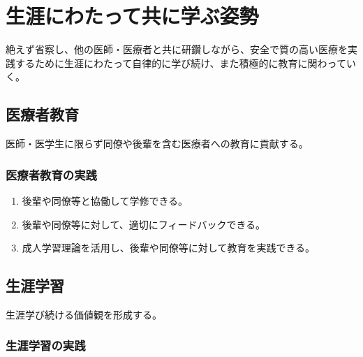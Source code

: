 \newpage

\hypertarget{ux751fux6dafux306bux308fux305fux3063ux3066ux5171ux306bux5b66ux3076ux59ffux52e2}{%
\section{生涯にわたって共に学ぶ姿勢}\label{ux751fux6dafux306bux308fux305fux3063ux3066ux5171ux306bux5b66ux3076ux59ffux52e2}}

絶えず省察し、他の医師・医療者と共に研鑽しながら、安全で質の高い医療を実践するために生涯にわたって自律的に学び続け、また積極的に教育に関わっていく。

\hypertarget{ux533bux7642ux8005ux6559ux80b2}{%
\subsection{医療者教育}\label{ux533bux7642ux8005ux6559ux80b2}}

医師・医学生に限らず同僚や後輩を含む医療者への教育に貢献する。

\hypertarget{ux533bux7642ux8005ux6559ux80b2ux306eux5b9fux8df5}{%
\subsubsection{医療者教育の実践}\label{ux533bux7642ux8005ux6559ux80b2ux306eux5b9fux8df5}}

\begin{enumerate}
\def\labelenumi{\arabic{enumi}.}
\tightlist
\item
  後輩や同僚等と協働して学修できる。
\item
  後輩や同僚等に対して、適切にフィードバックできる。
\item
  成人学習理論を活用し、後輩や同僚等に対して教育を実践できる。
\end{enumerate}

\hypertarget{ux751fux6dafux5b66ux7fd2}{%
\subsection{生涯学習}\label{ux751fux6dafux5b66ux7fd2}}

生涯学び続ける価値観を形成する。

\hypertarget{ux751fux6dafux5b66ux7fd2ux306eux5b9fux8df5}{%
\subsubsection{生涯学習の実践}\label{ux751fux6dafux5b66ux7fd2ux306eux5b9fux8df5}}

